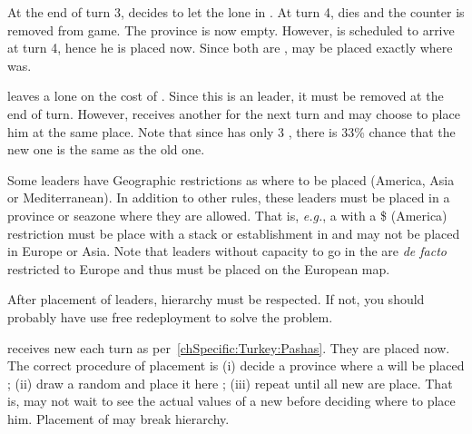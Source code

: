 \begin{exemple}
  At the end of turn 3, \HIS decides to let the lone  in
  \granderegionCuba. At turn 4, \leaderColon dies and the counter is removed
  from game. The province is now empty. However,  is
  scheduled to arrive at turn 4, hence he is placed now. Since both are
  \LeaderE, \leaderSolis may be placed exactly where \leaderColon was. %

  \smallskip

  \ANG leaves a lone \anonyme\LeaderC on the cost of \continentAmerica. Since
  this is an \anonyme leader, it must be removed at the end of turn. However,
  \ANG receives another \anonyme \LeaderC for the next turn and may choose to
  place him at the same place. Note that since \ANG has only 3
  \anonyme\LeaderC, there is 33\% chance that the new one is the same as the
  old one.
\end{exemple}

 Some leaders have Geographic restrictions as
where to be placed (America, Asia or Mediterranean).
\bparag In addition to other rules, these leaders must be placed in a province
or seazone where they are allowed.
\bparag That is, \emph{e.g.}, a \LeaderG with a \$ (America) restriction must
be place with a stack or establishment in \continentAmerica and may not be
placed in Europe or Asia.
\bparag Note that leaders without capacity to go in the \ROTW are \emph{de
  facto} restricted to Europe and thus must be placed on the European map.

\aparag[Hierarchy]
After placement of leaders, hierarchy must be respected.
\bparag If not, you should probably have use free redeployment to solve the
problem.

\aparag[\Pashas]
\TUR receives new \Pashas each turn as
per~\ref{chSpecific:Turkey:Pashas}. They are placed now.
\bparag The correct procedure of placement is (i) decide a province where a
\Pasha will be placed ; (ii) draw a random \Pasha and place it here ; (iii)
repeat until all new \Pashas are place.
\bparag That is, \TUR may not wait to see the actual values of a new \Pasha
before deciding where to place him.
\bparag Placement of \Pashas may break hierarchy.




